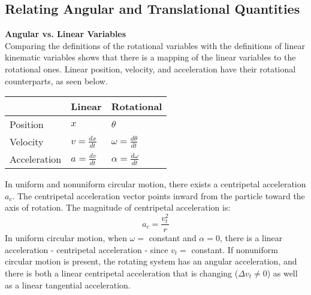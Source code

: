 \documentclass[a4paper]{article}
\let\bf\textbf
\newcommand\der[2]{\frac{d #1}{d #2}}
\begin{document}
\subsection{Relating Angular and Translational Quantities}
\bf{Angular vs. Linear Variables}
\vspace{2mm}\\
Comparing the definitions of the rotational variables with the definitions of linear kinematic variables shows that there is a mapping of the linear variables to the rotational ones. Linear position, velocity, and acceleration have their rotational counterparts, as seen below.
\begin{center}
    \begin{tabularx}{0.4\textwidth}{ 
        | >{\raggedright\arraybackslash}X
        | >{\centering\arraybackslash}X  
        | >{\centering\arraybackslash}X |}
        \hline
        & \bf{Linear} & \bf{Rotational}\\
        \hline
        Position & $x$ & $\theta$\\
        \hline
        Velocity & $v = \der{x}{t}$ & $\omega = \der{\theta}{t}$\\
        \hline
        Acceleration & $a = \der{v}{t}$ & $\alpha = \der{\omega}{t}$\\
        \hline
    \end{tabularx}
\end{center}
In uniform and nonuniform circular motion, there exists a centripetal acceleration $a_c$. The centripetal acceleration vector points inward from the particle toward the axis of rotation. The magnitude of centripetal acceleration is:
\begin{equation}
    a_c = \frac{v^2_t}{r}
\end{equation}
In uniform circular motion, when $\omega =$ constant and $\alpha = 0$, there is a linear acceleration - centripetal acceleration - since $v_t =$ constant. If nonuniform circular motion is present, the rotating system has an angular acceleration, and there is both a linear centripetal acceleration that is changing ($\Delta v_t \neq 0$) as well as a linear tangential acceleration.
\end{document}
